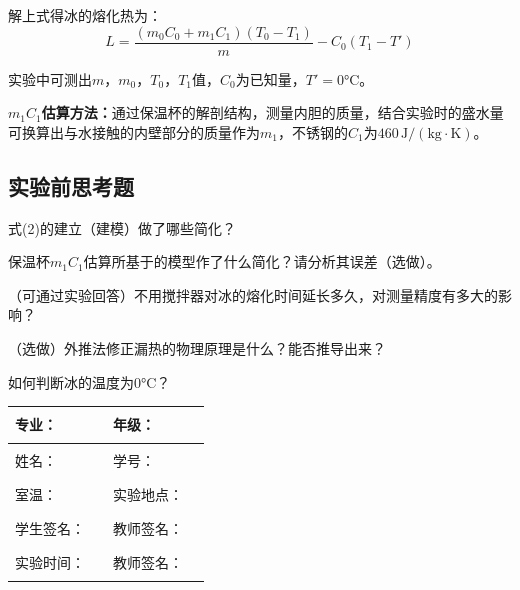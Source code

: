 \documentclass[dvipsnames, svgnames,a4paper,11pt]{article}
\newcommand{\recordblank}[1]{\par\vspace*{#1}\par}
\begin{document}
解上式得冰的熔化热为：
\begin{equation}
	L = \frac{(m_0C_0 + m_1C_1)(T_0 - T_1)}{m} - C_0(T_1 - T')
\end{equation}

实验中可测出$m$，$m_0$，$T_0$，$T_1$值，$C_0$为已知量，$T'=0°\mathrm{C}$。

\textbf{$m_1C_1$估算方法：}通过保温杯的解剖结构，测量内胆的质量，结合实验时的盛水量可换算出与水接触的内壁部分的质量作为$m_1$，不锈钢的$C_1$为$460\,\mathrm{J/(kg\cdot K)}$。


\subsection{实验前思考题}

\begin{question}
式(2)的建立（建模）做了哪些简化？
\end{question}
\recordblank{4cm}

\begin{question}
保温杯$m_1C_1$估算所基于的模型作了什么简化？请分析其误差（选做）。
\end{question}
\recordblank{4cm}

\begin{question}
（可通过实验回答）不用搅拌器对冰的熔化时间延长多久，对测量精度有多大的影响？
\end{question}
\recordblank{4cm}

\begin{question}
（选做）外推法修正漏热的物理原理是什么？能否推导出来？
\end{question}
\recordblank{4cm}

\begin{question}
如何判断冰的温度为$0°\mathrm{C}$？
\end{question}
\recordblank{4cm}

\clearpage
\begin{table}
	\renewcommand\arraystretch{1.7}
	\centering
	\begin{tabularx}{\textwidth}{|X|X|X|X|}
	\hline
	专业：& \rule{2.5cm}{0.4pt} & 年级：& \rule{2.5cm}{0.4pt}\\
	\hline
	姓名：& \rule{2.5cm}{0.4pt} & 学号：& \rule{2.5cm}{0.4pt}\\
	\hline
	室温：& \rule{2.5cm}{0.4pt} & 实验地点：& \rule{2.5cm}{0.4pt}\\
	\hline
	学生签名：& \rule{2.5cm}{0.4pt} & 教师签名：& \rule{2.5cm}{0.4pt}\\
	\hline
	实验时间：& \rule{2.5cm}{0.4pt} & 教师签名：& \rule{2.5cm}{0.4pt}\\
	\hline
	\end{tabularx}
\end{table}
\end{document}
